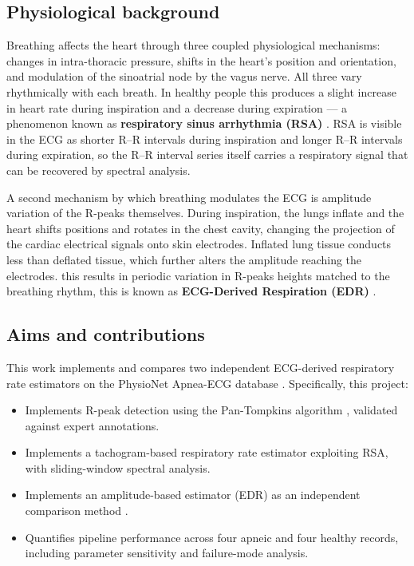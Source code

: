 \documentclass[11pt,a4paper]{article}
\begin{document}
\subsection{Physiological background}
Breathing affects the heart through three coupled physiological mechanisms: changes in intra-thoracic pressure, shifts in the heart's position and orientation, and modulation of the sinoatrial node by the vagus nerve. All three vary rhythmically with each breath. In healthy people this produces a slight increase in heart rate during inspiration and a decrease during expiration --- a phenomenon known as \textbf{respiratory sinus arrhythmia (RSA)} \cite{penzel2000apnea}. RSA is visible in the ECG as shorter R--R intervals during inspiration and longer R--R intervals during expiration, so the R--R interval series itself carries a respiratory signal that can be recovered by spectral analysis.

A second mechanism by which breathing modulates the ECG is amplitude variation of the R-peaks themselves. During inspiration, the lungs inflate and the heart shifts positions and rotates in the chest cavity, changing the projection of the cardiac electrical signals onto skin electrodes. Inflated lung tissue conducts less than deflated tissue, which further alters the amplitude reaching the electrodes. this results in periodic variation in R-peaks heights matched to the breathing rhythm, this is known as \textbf{ECG-Derived Respiration (EDR)} \cite{moody1985derivation}.

\subsection{Aims and contributions}

This work implements and compares two independent ECG-derived respiratory rate estimators on the PhysioNet Apnea-ECG database \cite{penzel2000apnea}. Specifically, this project:
\begin{itemize}
    \item Implements R-peak detection using the Pan-Tompkins algorithm \cite{pan1985real}, validated against expert annotations.
    \item Implements a tachogram-based respiratory rate estimator exploiting RSA, with sliding-window spectral analysis.
    \item Implements an amplitude-based estimator (EDR) as an independent comparison method \cite{moody1985derivation}.
    \item Quantifies pipeline performance across four apneic and four healthy records, including parameter sensitivity and failure-mode analysis.
\end{itemize}
\end{document}
